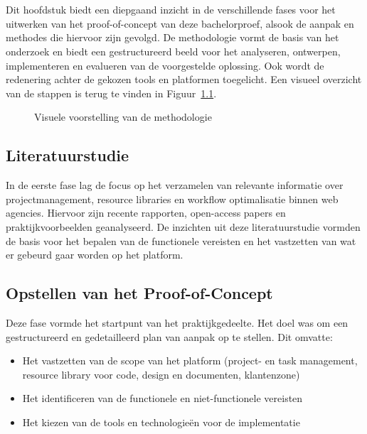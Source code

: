 
\chapter{}
\label{ch:methodologie}

Dit hoofdstuk biedt een diepgaand inzicht in de verschillende fases voor het uitwerken van het proof-of-concept van deze bachelorproef, alsook de aanpak en methodes die hiervoor zijn gevolgd. De methodologie vormt de basis van het onderzoek en biedt een gestructureerd beeld voor het analyseren, ontwerpen, implementeren en evalueren van de voorgestelde oplossing. Ook wordt de redenering achter de gekozen tools en platformen toegelicht. Een visueel overzicht van de stappen is terug te vinden in Figuur~\ref{fig:methodologie-flowchart}.

\begin{figure}[h]
    \centering
    \caption{Visuele voorstelling van de methodologie}
    \label{fig:methodologie-flowchart}
\end{figure}

\section{Literatuurstudie}
In de eerste fase lag de focus op het verzamelen van relevante informatie over projectmanagement, resource libraries en workflow optimalisatie binnen web agencies. Hiervoor zijn recente rapporten, open-access papers en praktijkvoorbeelden geanalyseerd. De inzichten uit deze literatuurstudie vormden de basis voor het bepalen van de functionele vereisten en het vastzetten van wat er gebeurd gaar worden op het platform.

\section{Opstellen van het Proof-of-Concept}
Deze fase vormde het startpunt van het praktijkgedeelte. Het doel was om een gestructureerd en gedetailleerd plan van aanpak op te stellen. Dit omvatte:
\begin{itemize}
    \item Het vastzetten van de scope van het platform (project- en task management, resource library voor code, design en documenten, klantenzone)
    \item Het identificeren van de functionele en niet-functionele vereisten
    \item Het kiezen van de tools en technologieën voor de implementatie
\end{itemize}


